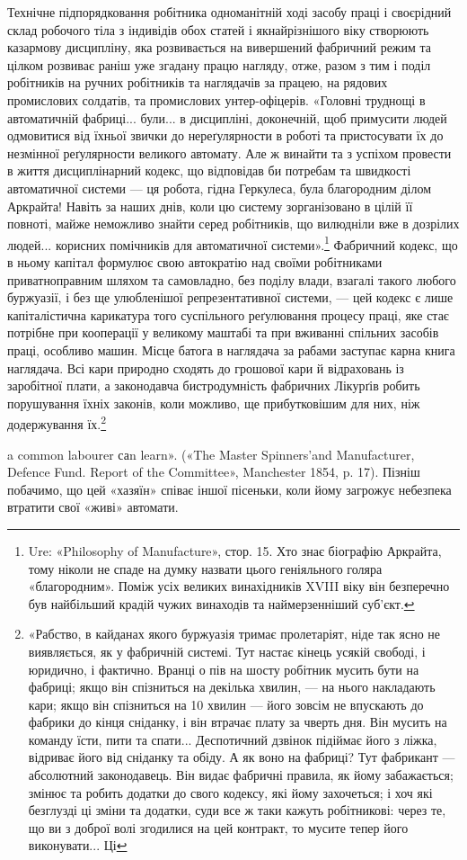 Технічне підпорядковання робітника одноманітній ході засобу
праці і своєрідний склад робочого тіла з індивідів обох статей
і якнайрізнішого віку створюють казармову дисципліну, яка
розвивається на вивершений фабричний режим та цілком розвиває
раніш уже згадану працю нагляду, отже, разом з тим і
поділ робітників на ручних робітників та наглядачів за працею,
на рядових промислових солдатів, та промислових унтер-офіцерів.
«Головні труднощі в автоматичній фабриці... були... в дисципліні,
доконечній, щоб примусити людей одмовитися від їхньої
звички до нереґулярности в роботі та пристосувати їх до незмінної
реґулярности великого автомату. Але ж винайти та з успіхом
провести в життя дисциплінарний кодекс, що відповідав би
потребам та швидкості автоматичної системи — ця робота, гідна
Геркулеса, була благородним ділом Аркрайта! Навіть за наших
днів, коли цю систему зорганізовано в цілій її повноті, майже
неможливо знайти серед робітників, що вилюдніли вже в дозрілих
людей... корисних помічників для автоматичної системи».\footnote{
Ure: «Philosophy of Manufacture», стор. 15. Хто знає біографію
Аркрайта, тому ніколи не спаде на думку назвати цього геніяльного
голяра «благородним». Поміж усіх великих винахідників XVIII віку
він безперечно був найбільший крадій чужих винаходів та наймерзенніший
суб’єкт.
}
Фабричний кодекс, що в ньому капітал формулює свою автократію
над своїми робітниками приватноправним шляхом та самовладно,
без поділу влади, взагалі такого любого буржуазії, і
без ще улюбленішої репрезентативної системи, — цей кодекс є
лише капіталістична карикатура того суспільного реґулювання
процесу праці, яке стає потрібне при кооперації у великому маштабі
та при вживанні спільних засобів праці, особливо машин.
Місце батога в наглядача за рабами заступає карна книга наглядача.
Всі кари природно сходять до грошової кари й відраховань
із заробітної плати, а законодавча бистродумність фабричних
Лікурґів робить порушування їхніх законів, коли можливо,
ще прибутковішим для них, ніж додержування їх.\footnote{
«Рабство, в кайданах якого буржуазія тримає пролетаріят, ніде
так ясно не виявляється, як у фабричній системі. Тут настає кінець
усякій свободі, і юридично, і фактично. Вранці о пів на шосту робітник
мусить бути на фабриці; якщо він спізниться на декілька хвилин, — на
нього накладають кари; якщо він спізниться на 10 хвилин — його зовсім
не впускають до фабрики до кінця сніданку, і він втрачає плату за
чверть дня. Він мусить на команду їсти, пити та спати... Деспотичний
дзвінок підіймає його з ліжка, відриває його від сніданку та обіду. А як
воно на фабриці? Тут фабрикант — абсолютний законодавець. Він видає
фабричні правила, як йому забажається; змінює та робить додатки
до свого кодексу, які йому захочеться; і хоч які безглузді ці зміни та
додатки, суди все ж таки кажуть робітникові: через те, що ви з доброї
волі згодилися на цей контракт, то мусите тепер його виконувати... Ці
}

a common labourer саn learn». («The Master Spinners’and Manufacturer,
Defence Fund. Report of the Committee», Manchester 1854, p. 17). Пізніш
побачимо, що цей «хазяїн» співає іншої пісеньки, коли йому загрожує
небезпека втратити свої «живі» автомати.